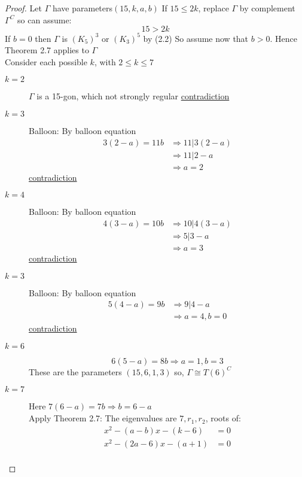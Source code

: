 \documentclass[]{article}
\theoremstyle{definition}
\theoremstyle{remark}
\numberwithin{equation}{section}
\begin{document}
				\begin{proof}
					Let $\Gamma$ have parameters$(15, k, a, b)$ If $15 \leq 2k$, replace $\Gamma$ by complement $\Gamma^C$ so can assume:
					\[ 15 > 2k\]
					If $b=0$ then $\Gamma$ is $(K_5)^3$ or $(K_3)^5$ by (2.2)
					So assume now that $b>0$. Hence Theorem 2.7 applies to $\Gamma$\\
					Consider each possible $k$, with $2 \leq k \leq 7$
					\begin{description}
						\item[$k=2$] $\Gamma$ is a 15-gon, which not strongly regular \underline{contradiction}
						\item[$k=3$] Balloon:
							By balloon equation
							\begin{align*}
								3(2-a) = 11b &\Rightarrow 11 | 3(2-a) \\
									&\Rightarrow 11 | 2-a \\
									&\Rightarrow a = 2
							\end{align*}
							\underline{contradiction}
						\item[$k=4$] Balloon:
							By balloon equation
							\begin{align*}
								4(3-a) = 10b &\Rightarrow 10 | 4(3-a) \\
									&\Rightarrow 5 | 3-a \\
									&\Rightarrow a = 3
							\end{align*}
							\underline{contradiction}
						\item[$k=3$] Balloon:
							By balloon equation
							\begin{align*}
								5(4-a) = 9b &\Rightarrow 9 | 4-a \\
									&\Rightarrow a = 4, b =0
							\end{align*}
							\underline{contradiction}
						\item[$k=6$]
							\[6(5-a) = 8b \Rightarrow a=1, b = 3 \]
							These are the parameters $(15, 6, 1, 3)$ so, $\Gamma \cong T(6)^C$
						\item[$k=7$]
							Here $7(6-a) = 7b \Rightarrow b = 6 - a$\\
							Apply Theorem 2.7:
							The eigenvalues are $7, r_1, r_2$, roots of:
							\begin{align*}
								x^2 - (a - b) x - (k -6 ) &= 0\\
								x^2 - (2a - 6) x - (a + 1) &= 0\\ 

\end{align*}
\end{description}
\end{proof}
\end{document}
